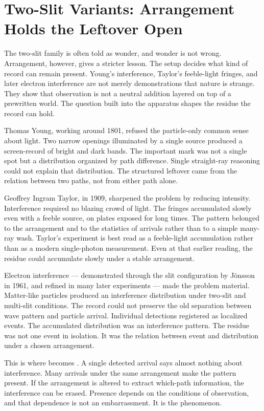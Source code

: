 \section{Two-Slit Variants: Arrangement Holds the Leftover Open}

The two-slit family is often told as wonder, and wonder is not wrong.
Arrangement, however, gives a stricter lesson. The setup decides what kind of
record can remain present. Young's interference, Taylor's feeble-light fringes,
and later electron interference are not merely demonstrations that nature is
strange. They show that observation is not a neutral addition layered on top
of a prewritten world. The question built into the apparatus shapes the
residue the record can hold.

Thomas Young, working around 1801, refused the particle-only common sense
about light. Two narrow openings illuminated by a single source produced a
screen-record of bright and dark bands. The important mark was not a single
spot but a distribution organized by path difference. Single straight-ray
reasoning could not explain that distribution. The structured leftover came
from the relation between two paths, not from either path alone.

Geoffrey Ingram Taylor, in 1909, sharpened the problem by reducing intensity.
Interference required no blazing crowd of light. The fringes accumulated
slowly even with a feeble source, on plates exposed for long times. The
pattern belonged to the arrangement and to the statistics of arrivals rather
than to a simple many-ray wash. Taylor's experiment is best read as a
feeble-light accumulation rather than as a modern single-photon measurement.
Even at that earlier reading, the residue could accumulate slowly under a
stable arrangement.

Electron interference --- demonstrated through the slit configuration by
J\"onsson in 1961, and refined in many later experiments --- made the problem
material. Matter-like particles produced an interference distribution under
two-slit and multi-slit conditions. The record could not preserve the old
separation between wave pattern and particle arrival. Individual detections
registered as localized events. The accumulated distribution was an
interference pattern. The residue was not one event in isolation. It was the
relation between event and distribution under a chosen arrangement.

This is where  becomes . A single detected
arrival says almost nothing about interference. Many arrivals under the same
arrangement make the pattern present. If the arrangement is altered to
extract which-path information, the interference can be erased. Presence
depends on the conditions of observation, and that dependence is not an
embarrassment. It is the phenomenon.

